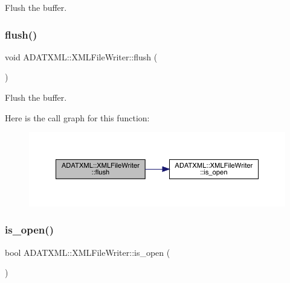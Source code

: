 Flush the buffer. 

\mbox{\label{classADATXML_1_1XMLFileWriter_a63097bd3fafbcf99804b4106700b524d}} 
\subsubsection{\texorpdfstring{flush()}{flush()}\hspace{0.1cm}{\footnotesize\ttfamily [3/3]}}
{\footnotesize\ttfamily void A\+D\+A\+T\+X\+M\+L\+::\+X\+M\+L\+File\+Writer\+::flush (\begin{DoxyParamCaption}{ }\end{DoxyParamCaption})}



Flush the buffer. 

Here is the call graph for this function\+:
\nopagebreak
\begin{figure}[H]
\begin{center}
\leavevmode
\includegraphics[width=350pt]{d6/ddb/classADATXML_1_1XMLFileWriter_a63097bd3fafbcf99804b4106700b524d_cgraph}
\end{center}
\end{figure}
\mbox{\label{classADATXML_1_1XMLFileWriter_a60fa87bbd9300c37386f9fdcb9460f74}} 
\subsubsection{\texorpdfstring{is\_open()}{is\_open()}\hspace{0.1cm}{\footnotesize\ttfamily [1/3]}}
{\footnotesize\ttfamily bool A\+D\+A\+T\+X\+M\+L\+::\+X\+M\+L\+File\+Writer\+::is\+\_\+open (\begin{DoxyParamCaption}{ }\end{DoxyParamCaption})}

